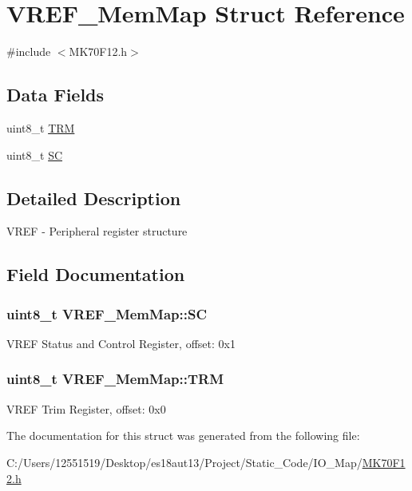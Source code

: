 \hypertarget{struct_v_r_e_f___mem_map}{}\section{V\+R\+E\+F\+\_\+\+Mem\+Map Struct Reference}
\label{struct_v_r_e_f___mem_map}


{\ttfamily \#include $<$M\+K70\+F12.\+h$>$}

\subsection*{Data Fields}
\begin{DoxyCompactItemize}
\item 
uint8\+\_\+t \hyperlink{struct_v_r_e_f___mem_map_a987ecd280eb0b25ff58841b304de2e1f}{T\+R\+M}
\item 
uint8\+\_\+t \hyperlink{struct_v_r_e_f___mem_map_a5d8e7e9026a69a14ff0d0b3caee5cf24}{S\+C}
\end{DoxyCompactItemize}


\subsection{Detailed Description}
V\+R\+E\+F -\/ Peripheral register structure 

\subsection{Field Documentation}
\hypertarget{struct_v_r_e_f___mem_map_a5d8e7e9026a69a14ff0d0b3caee5cf24}{}
\subsubsection[{S\+C}]{\setlength{\rightskip}{0pt plus 5cm}uint8\+\_\+t V\+R\+E\+F\+\_\+\+Mem\+Map\+::\+S\+C}\label{struct_v_r_e_f___mem_map_a5d8e7e9026a69a14ff0d0b3caee5cf24}
V\+R\+E\+F Status and Control Register, offset\+: 0x1 \hypertarget{struct_v_r_e_f___mem_map_a987ecd280eb0b25ff58841b304de2e1f}{}
\subsubsection[{T\+R\+M}]{\setlength{\rightskip}{0pt plus 5cm}uint8\+\_\+t V\+R\+E\+F\+\_\+\+Mem\+Map\+::\+T\+R\+M}\label{struct_v_r_e_f___mem_map_a987ecd280eb0b25ff58841b304de2e1f}
V\+R\+E\+F Trim Register, offset\+: 0x0 

The documentation for this struct was generated from the following file\+:\begin{DoxyCompactItemize}
\item 
C\+:/\+Users/12551519/\+Desktop/es18aut13/\+Project/\+Static\+\_\+\+Code/\+I\+O\+\_\+\+Map/\hyperlink{_m_k70_f12_8h}{M\+K70\+F12.\+h}\end{DoxyCompactItemize}
